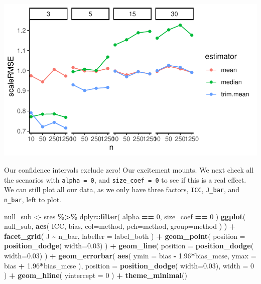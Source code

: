 \documentclass[
]{book}
\newenvironment{Shaded}{\begin{snugshade}}{\end{snugshade}}
\newcommand{\AttributeTok}[1]{\textcolor[rgb]{0.13,0.29,0.53}{#1}}
\newcommand{\DecValTok}[1]{\textcolor[rgb]{0.00,0.00,0.81}{#1}}
\newcommand{\FloatTok}[1]{\textcolor[rgb]{0.00,0.00,0.81}{#1}}
\newcommand{\FunctionTok}[1]{\textcolor[rgb]{0.13,0.29,0.53}{\textbf{#1}}}
\newcommand{\NormalTok}[1]{#1}
\newcommand{\OtherTok}[1]{\textcolor[rgb]{0.56,0.35,0.01}{#1}}
\newcommand{\SpecialCharTok}[1]{\textcolor[rgb]{0.81,0.36,0.00}{\textbf{#1}}}
\begin{document}
\begin{center}\includegraphics[width=0.75\linewidth]{Designing-Simulations-in-R_files/figure-latex/unnamed-chunk-171-1} \end{center}

Our confidence intervals exclude zero!
Our excitement mounts.
We next check all the scenarios with \texttt{alpha\ =\ 0}, and \texttt{size\_coef\ =\ 0} to see if this is a real effect.
We can still plot all our data, as we only have three factors, \texttt{ICC}, \texttt{J\_bar}, and \texttt{n\_bar}, left to plot.

\begin{Shaded}
\begin{Highlighting}[]
\NormalTok{null\_sub }\OtherTok{\textless{}{-}}\NormalTok{ sres }\SpecialCharTok{\%\textgreater{}\%}
\NormalTok{  dplyr}\SpecialCharTok{::}\FunctionTok{filter}\NormalTok{( alpha }\SpecialCharTok{==} \DecValTok{0}\NormalTok{, size\_coef }\SpecialCharTok{==} \DecValTok{0}\NormalTok{ )}
\FunctionTok{ggplot}\NormalTok{( null\_sub, }\FunctionTok{aes}\NormalTok{( ICC, bias, }
                       \AttributeTok{col=}\NormalTok{method, }\AttributeTok{pch=}\NormalTok{method, }\AttributeTok{group=}\NormalTok{method ) ) }\SpecialCharTok{+}
  \FunctionTok{facet\_grid}\NormalTok{( J }\SpecialCharTok{\textasciitilde{}}\NormalTok{ n\_bar, }\AttributeTok{labeller =}\NormalTok{ label\_both ) }\SpecialCharTok{+}
  \FunctionTok{geom\_point}\NormalTok{( }\AttributeTok{position =} \FunctionTok{position\_dodge}\NormalTok{( }\AttributeTok{width=}\FloatTok{0.03}\NormalTok{) ) }\SpecialCharTok{+}
  \FunctionTok{geom\_line}\NormalTok{( }\AttributeTok{position =} \FunctionTok{position\_dodge}\NormalTok{( }\AttributeTok{width=}\FloatTok{0.03}\NormalTok{) ) }\SpecialCharTok{+}
  \FunctionTok{geom\_errorbar}\NormalTok{( }\FunctionTok{aes}\NormalTok{( }\AttributeTok{ymin =}\NormalTok{ bias }\SpecialCharTok{{-}} \FloatTok{1.96}\SpecialCharTok{*}\NormalTok{bias\_mcse,}
                      \AttributeTok{ymax =}\NormalTok{ bias }\SpecialCharTok{+} \FloatTok{1.96}\SpecialCharTok{*}\NormalTok{bias\_mcse ),}
                 \AttributeTok{position =} \FunctionTok{position\_dodge}\NormalTok{( }\AttributeTok{width=}\FloatTok{0.03}\NormalTok{),}
                 \AttributeTok{width =} \DecValTok{0}\NormalTok{ ) }\SpecialCharTok{+}
  \FunctionTok{geom\_hline}\NormalTok{( }\AttributeTok{yintercept =} \DecValTok{0}\NormalTok{ ) }\SpecialCharTok{+}
  \FunctionTok{theme\_minimal}\NormalTok{() }
\end{Highlighting}
\end{Shaded}
\end{document}
